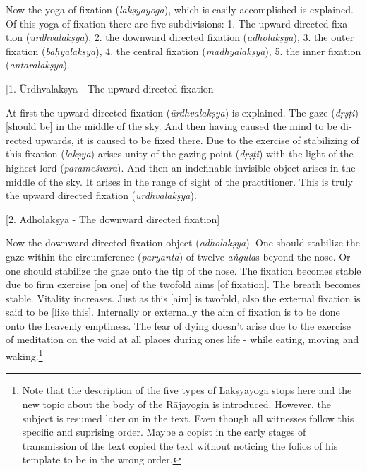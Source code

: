 \begin{otherlanguage}{english}
    \bigskip
 \begin{tlate}
   Now the yoga of fixation (\textit{lakṣyayoga}), which is easily accomplished is explained. Of this yoga of fixation there are five subdivisions:
   1. The upward directed fixation (\textit{ūrdhvalakṣya}),
   2. the downward directed fixation (\textit{adholakṣya}),
   3. the outer fixation (\textit{baḥyalakṣya}),
   4. the central fixation (\textit{madhyalakṣya}),
   5. the inner fixation (\textit{antaralakṣya}).
 \end{tlate}
     \bigskip
    \centerline{\textrm{\small{[1. Ūrdhvalakṣya - The upward directed fixation]}}}
    \bigskip    
  \begin{tlate}
At first the upward directed fixation (\textit{ūrdhvalakṣya}) is explained. The gaze (\textit{dṛṣṭi}) [should be] in the middle of the sky. And then having caused the mind to be directed upwards, it is caused to be fixed there. Due to the exercise of stabilizing of this fixation (\textit{lakṣya}) arises unity of the gazing point (\textit{dṛṣṭi}) with the light of the highest lord (\textit{parameśvara}). And then an indefinable invisible object arises in the middle of the sky. It arises in the range of sight of the practitioner. This is truly the upward directed fixation (\textit{ūrdhvalakṣya}).
  \end{tlate}
   \bigskip
    \centerline{\textrm{\small{[2. Adholakṣya - The downward directed fixation]}}}
    \bigskip
  \begin{tlate}
    Now the downward directed fixation object (\textit{adholakṣya}). One should stabilize the gaze within the circumference (\textit{paryanta}) of twelve \textit{aṅgula}s beyond the nose. Or one should stabilize the gaze onto the tip of the nose. The fixation becomes stable due to firm exercise [on one] of the twofold aims [of fixation]. The breath becomes stable. Vitality increases. Just as this [aim] is twofold, also the external fixation is said to be [like this]. Internally or externally the aim of fixation is to be done onto the heavenly emptiness. The fear of dying doesn't arise due to the exercise of meditation on the void at all places during ones life - while eating, moving and waking.\footnote{Note that the description of the five types of Lakṣyayoga stops here and the new topic about the body of the Rājayogin is introduced. However, the subject is resumed later on in the text. Even though all witnesses follow this specific and suprising order. Maybe a copist in the early stages of transmission of the text copied the text without noticing the folios of his template to be in the wrong order.}

\end{tlate}
\end{otherlanguage}

